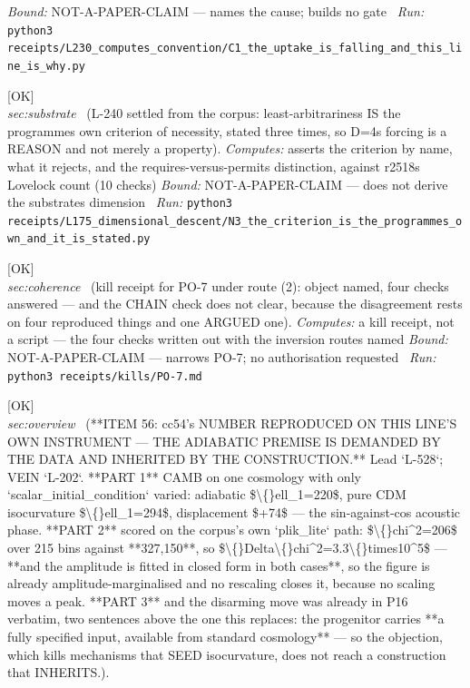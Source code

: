 \begin{description}
 \emph{Bound:} NOT-A-PAPER-CLAIM --- names the cause; builds no gate
\ \emph{Run:} \texttt{python3 receipts/L230\_computes\_convention/C1\_the\_uptake\_is\_falling\_and\_this\_line\_is\_why.py}
\item[\label{rcpt:N3_the_criterion_is_the_programmes_own_and_it_is_stated}\texttt{N3\_the\_criterion\_is\_the\_programmes\_own\_and\_it\_is\_stated}]\hfill\textsf{[OK]}\\
\textit{sec:substrate} \ (L-240 settled from the corpus: least-arbitrariness IS the programmes own criterion of necessity, stated three times, so D=4s forcing is a REASON and not merely a property). 
\emph{Computes:} asserts the criterion by name, what it rejects, and the requires-versus-permits distinction, against r2518s Lovelock count (10 checks)
 \emph{Bound:} NOT-A-PAPER-CLAIM --- does not derive the substrates dimension
\ \emph{Run:} \texttt{python3 receipts/L175\_dimensional\_descent/N3\_the\_criterion\_is\_the\_programmes\_own\_and\_it\_is\_stated.py}
\item[\label{rcpt:PO-7}\texttt{PO-7}]\hfill\textsf{[OK]}\\
\textit{sec:coherence} \ (kill receipt for PO-7 under route (2): object named, four checks answered --- and the CHAIN check does not clear, because the disagreement rests on four reproduced things and one ARGUED one). 
\emph{Computes:} a kill receipt, not a script --- the four checks written out with the inversion routes named
 \emph{Bound:} NOT-A-PAPER-CLAIM --- narrows PO-7; no authorisation requested
\ \emph{Run:} \texttt{python3 receipts/kills/PO-7.md}
\item[\label{rcpt:P16_the_adiabatic_premise_is_demanded_by_the_data_and_inherited_by_the_construction}\texttt{P16\_the\_adiabatic\_premise\_is\_demanded\_by\_the\_data\_and\_inherited\_by\_the\_construction}]\hfill\textsf{[OK]}\\
\textit{sec:overview} \ (**ITEM 56: cc54's NUMBER REPRODUCED ON THIS LINE'S OWN INSTRUMENT --- THE ADIABATIC PREMISE IS DEMANDED BY THE DATA AND INHERITED BY THE CONSTRUCTION.** Lead `L-528`; VEIN `L-202`. **PART 1** CAMB on one cosmology with only `scalar\_initial\_condition` varied: adiabatic \$\textbackslash\{\}ell\_1=220\$, pure CDM isocurvature \$\textbackslash\{\}ell\_1=294\$, displacement \$+74\$ --- the sin-against-cos acoustic phase. **PART 2** scored on the corpus's own `plik\_lite` path: \$\textbackslash\{\}chi\textasciicircum{}2=206\$ over 215 bins against **327,150**, so \$\textbackslash\{\}Delta\textbackslash\{\}chi\textasciicircum{}2=3.3\textbackslash\{\}times10\textasciicircum{}5\$ --- **and the amplitude is fitted in closed form in both cases**, so the figure is already amplitude-marginalised and no rescaling closes it, because no scaling moves a peak. **PART 3** and the disarming move was already in P16 verbatim, two sentences above the one this replaces: the progenitor carries **a fully specified input, available from standard cosmology** --- so the objection, which kills mechanisms that SEED isocurvature, does not reach a construction that INHERITS.). 

\end{description}
